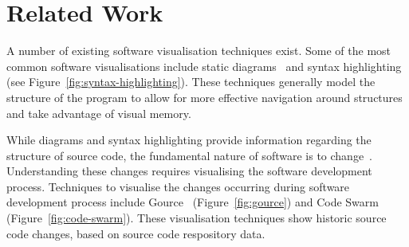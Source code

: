 \section{Related Work}

A number of existing software visualisation techniques exist. Some of the most common software visualisations include static diagrams~ and syntax highlighting (see Figure~\ref{fig:syntax-highlighting}). These techniques generally model the structure of the program to allow for more effective navigation around structures and take advantage of visual memory.

While diagrams and syntax highlighting provide information regarding the structure of source code, the fundamental nature of software is to change~. Understanding these changes requires visualising the software development process. Techniques to visualise the changes occurring during software development process include Gource~\cite{Caudwell2010} (Figure~\ref{fig:gource}) and Code Swarm~\cite{Ogawa2012} (Figure~\ref{fig:code-swarm}). These visualisation techniques show historic source code changes, based on source code respository data.


